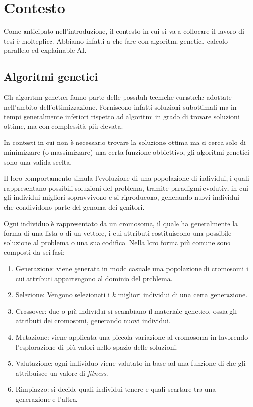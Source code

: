 \chapter{Contesto}

Come anticipato nell'introduzione, il contesto in cui si va a collocare il
lavoro di tesi è molteplice. Abbiamo infatti a che fare con algoritmi genetici,
calcolo parallelo ed explainable AI.

\section{Algoritmi genetici}

Gli algoritmi genetici fanno parte delle possibili tecniche euristiche adottate
nell'ambito dell'ottimizzazione. Forniscono infatti soluzioni subottimali ma
in tempi generalmente inferiori rispetto ad algoritmi in grado di trovare
soluzioni ottime, ma con complessità più elevata.

In contesti in cui non è necessario trovare la soluzione ottima ma si cerca
solo di minimizzare (o massimizzare) una certa funzione obbiettivo, gli
algoritmi genetici sono una valida scelta.

Il loro comportamento simula l'evoluzione di una popolazione di individui, i
quali rappresentano possibili soluzioni del problema, tramite paradigmi
evolutivi in cui gli individui migliori sopravvivono e si riproducono,
generando nuovi individui che condividono parte del genoma dei genitori.

Ogni individuo è rappresentato da un cromosoma, il quale ha generalmente la
forma di una lista o di un vettore, i cui attributi costituiscono una possibile
soluzione al problema o una sua codifica. Nella loro forma più comune sono
composti da sei fasi:

\begin{enumerate}
	\item Generazione: viene generata in modo casuale una popolazione di
	      cromosomi i cui attributi appartengono al dominio del problema.
	\item Selezione: Vengono selezionati i $k$ migliori individui di una certa
	      generazione.
	\item Crossover: due o più individui si scambiano il materiale genetico,
	      ossia gli attributi dei cromosomi, generando nuovi individui.
	\item Mutazione: viene applicata una piccola variazione al cromosoma in
	      favorendo l'esplorazione di più valori nello spazio delle soluzioni.
	\item Valutazione: ogni individuo viene valutato in base ad una funzione di
	      che gli attribuisce un valore di \textit{fitness}.
	\item Rimpiazzo: si decide quali individui tenere e quali scartare tra una
	      generazione e l'altra.
\end{enumerate}

